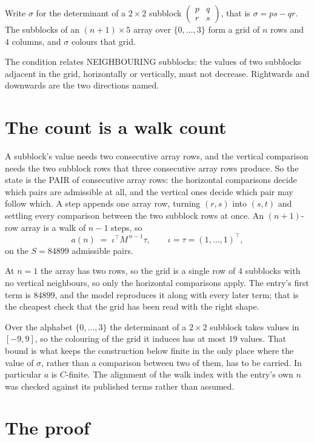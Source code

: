 \documentclass[11pt,a4paper]{article}
\theoremstyle{plain}
\theoremstyle{definition}
\begin{document}
Write $\sigma$ for the determinant of a $2\times2$ subblock
$\begin{pmatrix}p&q\\r&s\end{pmatrix}$, that is $\sigma=ps-qr$. The subblocks of an
$(n+1)\times5$ array over $\{0,\dots,3\}$ form a grid of $n$ rows and $4$
columns, and $\sigma$ colours that grid.

The condition relates NEIGHBOURING subblocks: the values of two subblocks adjacent in the grid,
horizontally or vertically, must not decrease. Rightwards and downwards are the two directions named.

\section{The count is a walk count}

A subblock's value needs two consecutive array rows, and the vertical
comparison needs the two subblock rows that three consecutive array rows produce. So the state
is the PAIR of consecutive array rows: the horizontal comparisons decide which pairs are
admissible at all, and the vertical ones decide which pair may follow which. A step appends one
array row, turning $(r,s)$ into $(s,t)$ and settling every comparison between the two subblock
rows at once. An $(n+1)$-row array is a walk of $n-1$ steps, so
\[
a(n)\;=\;\iota^{\!\top}M^{\,n-1}\tau,\qquad\iota=\tau=(1,\dots,1)^{\!\top},
\]
on the $S=84899$ admissible pairs.

At $n=1$ the array has two rows, so the grid is a single row of $4$
subblocks with no vertical neighbours, so only the horizontal comparisons apply. The
entry's first term is $84899$, and the model reproduces it along with every later term; that
is the cheapest check that the grid has been read with the right shape.

Over the alphabet $\{0,\dots,3\}$ the determinant of a $2\times2$ subblock takes values in
$[-9,9]$, so the colouring of the grid it induces has at most $19$ values.
That bound is what keeps the construction below finite in the only place where the value of
$\sigma$, rather than a comparison between two of them, has to be carried.
In particular $a$ is $C$-finite. The alignment of the walk index with the entry's own $n$ was
checked against its published terms rather than assumed.

\section{The proof}
\end{document}
